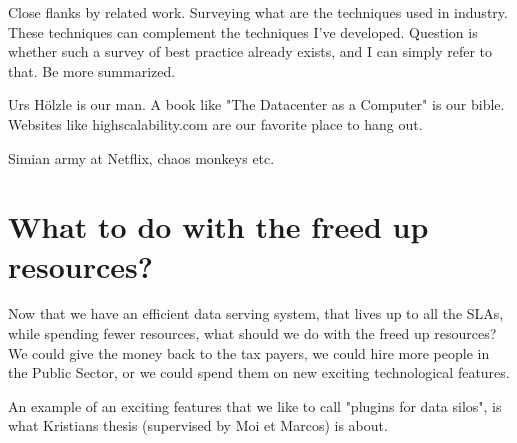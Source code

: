 Close flanks by related work. Surveying what are the techniques used in industry. These techniques can complement the techniques I've developed. Question is whether such a survey of best practice already exists, and I can simply refer to that. Be more summarized.

Urs H{\"o}lzle is our man. A book like "The Datacenter as a Computer" is our bible. Websites like highscalability.com are our favorite place to hang out.

Simian army at Netflix, chaos monkeys etc. 

\section{What to do with the freed up resources?}
Now that we have an efficient data serving system, that lives up to all the SLAs, while spending fewer resources, what should we do with the freed up resources? We could give the money back to the tax payers, we could hire more people in the Public Sector, or we could spend them on new exciting technological features.

An example of an exciting features that we like to call "plugins for data silos", is what Kristians thesis (supervised by Moi et Marcos) is about.

